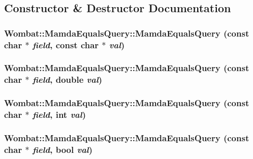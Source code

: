 \subsection{Constructor \& Destructor Documentation}
\hypertarget{classWombat_1_1MamdaEqualsQuery_5f25a08aac5b624213104d3526def6ec}{
\subsubsection[MamdaEqualsQuery]{\setlength{\rightskip}{0pt plus 5cm}Wombat::Mamda\-Equals\-Query::Mamda\-Equals\-Query (const char $\ast$ {\em field}, const char $\ast$ {\em val})}}
\label{classWombat_1_1MamdaEqualsQuery_5f25a08aac5b624213104d3526def6ec}


\hypertarget{classWombat_1_1MamdaEqualsQuery_935a146d1aed106cca65469f307bc54a}{
\subsubsection[MamdaEqualsQuery]{\setlength{\rightskip}{0pt plus 5cm}Wombat::Mamda\-Equals\-Query::Mamda\-Equals\-Query (const char $\ast$ {\em field}, double {\em val})}}
\label{classWombat_1_1MamdaEqualsQuery_935a146d1aed106cca65469f307bc54a}


\hypertarget{classWombat_1_1MamdaEqualsQuery_fe445345550d741d7a739b1f42f823a9}{
\subsubsection[MamdaEqualsQuery]{\setlength{\rightskip}{0pt plus 5cm}Wombat::Mamda\-Equals\-Query::Mamda\-Equals\-Query (const char $\ast$ {\em field}, int {\em val})}}
\label{classWombat_1_1MamdaEqualsQuery_fe445345550d741d7a739b1f42f823a9}


\hypertarget{classWombat_1_1MamdaEqualsQuery_289475a1124e35325eef49a1b230b31b}{
\subsubsection[MamdaEqualsQuery]{\setlength{\rightskip}{0pt plus 5cm}Wombat::Mamda\-Equals\-Query::Mamda\-Equals\-Query (const char $\ast$ {\em field}, bool {\em val})}}
\label{classWombat_1_1MamdaEqualsQuery_289475a1124e35325eef49a1b230b31b}





